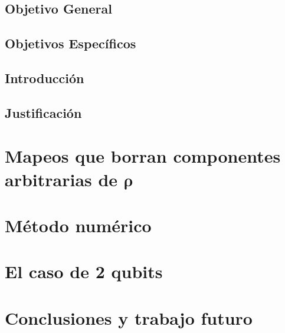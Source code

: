 \documentclass[11pt,dvipsnames]{report} %
\newcommand{\1}{\mathds{1}}
\begin{document}
\newtheorem{property}{Propiedad}[section]
\section*{Objetivo General}
\section*{Objetivos Específicos}
\section*{Introducción}
\section*{Justificación}



\chapter{Mapeos que borran componentes arbitrarias de $\boldsymbol{\rho}$}
\chapter{Método numérico}
\chapter{El caso de 2 qubits}
\chapter{Conclusiones y trabajo futuro}


\end{document}
